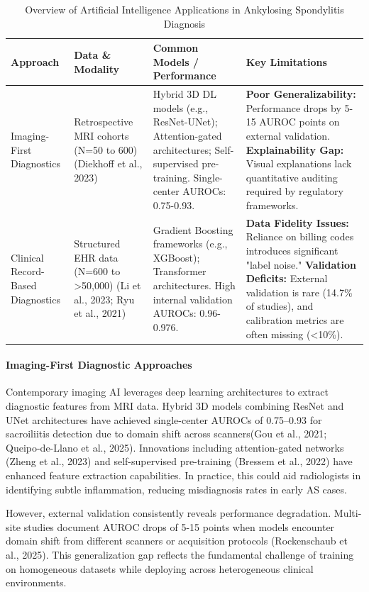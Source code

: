 \documentclass[12pt, a4paper]{article}
\begin{document}
\begin{table}[H]
\centering
\normalsize
\caption{Overview of Artificial Intelligence Applications in Ankylosing Spondylitis Diagnosis}
\label{tab:ai_applications}
\begin{tabularx}{\textwidth}{p{2cm} p{2.5cm} p{3.5cm} X}
\toprule
\textbf{Approach} & \textbf{Data \& Modality} & \textbf{Common Models / Performance} & \textbf{Key Limitations} \\
\midrule
Imaging-First Diagnostics & Retrospective MRI cohorts (N=50 to 600) (Diekhoff et al., 2023) & Hybrid 3D DL models (e.g., ResNet-UNet); Attention-gated architectures; Self-supervised pre-training. Single-center AUROCs: 0.75-0.93. & \textbf{Poor Generalizability:} Performance drops by 5-15 AUROC points on external validation. \textbf{Explainability Gap:} Visual explanations lack quantitative auditing required by regulatory frameworks. \\
\addlinespace
Clinical Record-Based Diagnostics & Structured EHR data (N=600 to >50,000) (Li et al., 2023; Ryu et al., 2021) & Gradient Boosting frameworks (e.g., XGBoost); Transformer architectures. High internal validation AUROCs: 0.96-0.976. & \textbf{Data Fidelity Issues:} Reliance on billing codes introduces significant "label noise." \textbf{Validation Deficits:} External validation is rare (14.7\% of studies), and calibration metrics are often missing (<10\%). \\
\bottomrule
\end{tabularx}
\end{table}




\paragraph{Imaging-First Diagnostic Approaches}
Contemporary imaging AI leverages deep learning architectures to extract diagnostic features from MRI data. Hybrid 3D models combining ResNet and UNet architectures have achieved single-center AUROCs of 0.75--0.93 for sacroiliitis detection due to domain shift across scanners(Gou et al., 2021; Queipo-de-Llano et al., 2025). Innovations including attention-gated networks (Zheng et al., 2023) and self-supervised pre-training (Bressem et al., 2022) have enhanced feature extraction capabilities. In practice, this could aid radiologists in identifying subtle inflammation, reducing misdiagnosis rates in early AS cases.

However, external validation consistently reveals performance degradation. Multi-site studies document AUROC drops of 5-15 points when models encounter domain shift from different scanners or acquisition protocols (Rockenschaub et al., 2025). This generalization gap reflects the fundamental challenge of training on homogeneous datasets while deploying across heterogeneous clinical environments.
\end{document}

